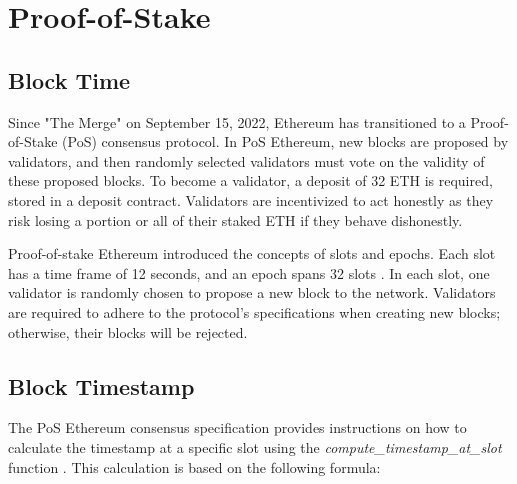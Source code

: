 

%

\section{Proof-of-Stake}

\subsection{Block Time}

Since "The Merge" on September 15, 2022, Ethereum has transitioned to a
Proof-of-Stake (PoS) consensus protocol. In PoS Ethereum, new blocks are
proposed by validators, and then randomly selected validators must vote on the
validity of these proposed blocks. To become a validator, a deposit of 32 ETH
is required, stored in a deposit contract. Validators are incentivized to act
honestly as they risk losing a portion or all of their staked ETH if they
behave dishonestly.

Proof-of-stake Ethereum introduced the concepts of slots and epochs. Each slot
has a time frame of 12 seconds, and an epoch spans 32 slots
\cite{seconds-per-slot-mainnet}\cite{seconds-per-slot-mainnet-doc}. In each
slot, one validator is randomly chosen to propose a new block to the network.
Validators are required to adhere to the protocol's specifications when
creating new blocks; otherwise, their blocks will be rejected.

\subsection{Block Timestamp}

The PoS Ethereum consensus specification provides instructions on how to
calculate the timestamp at a specific slot using the
\textit{compute\_timestamp\_at\_slot} function \cite{compute-timestamp-at-slot}.
This calculation is based on the following formula:


